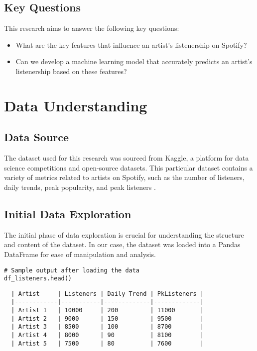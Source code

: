 \documentclass[12pt]{article}
\begin{document}
\subsection{Key Questions}

This research aims to answer the following key questions:

\begin{itemize}
    \item What are the key features that influence an artist's listenership on Spotify?
    \item Can we develop a machine learning model that accurately predicts an artist's listenership based on these features?
\end{itemize}

\newpage

\section{Data Understanding}

\subsection{Data Source}

The dataset used for this research was sourced from Kaggle, a platform for data science competitions and open-source datasets. This particular dataset contains a variety of metrics related to artists on Spotify, such as the number of listeners, daily trends, peak popularity, and peak listeners \cite{kaggle}.

\subsection{Initial Data Exploration}

The initial phase of data exploration is crucial for understanding the structure and content of the dataset. In our case, the dataset was loaded into a Pandas DataFrame for ease of manipulation and analysis.

\begin{lstlisting}
# Sample output after loading the data
df_listeners.head()
\end{lstlisting}

\begin{verbatim}
  | Artist     | Listeners | Daily Trend | PkListeners |
  |------------|-----------|-------------|-------------|
  | Artist 1   | 10000     | 200         | 11000       |
  | Artist 2   | 9000      | 150         | 9500        |
  | Artist 3   | 8500      | 100         | 8700        |
  | Artist 4   | 8000      | 90          | 8100        |
  | Artist 5   | 7500      | 80          | 7600        |
\end{verbatim}
\end{document}
